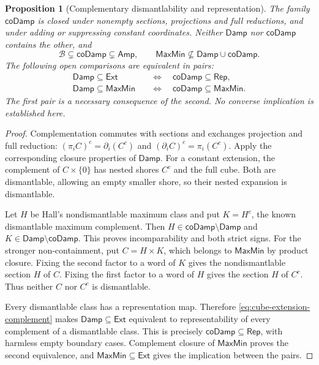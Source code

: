 \documentclass[11pt]{article}
\newtheorem{proposition}{Proposition}[section]
\theoremstyle{definition}
\newcommand{\Amp}{\mathsf{Amp}}
\newcommand{\MaxMin}{\mathsf{MaxMin}}
\newcommand{\Damp}{\mathsf{Damp}}
\newcommand{\Rep}{\mathsf{Rep}}
\begin{document}
\begin{proposition}[Complementary dismantlability and representation]
\label{prop:complement-dismantlable}
The family $\mathsf{coDamp}$ is closed under nonempty sections, projections
and full reductions, and under adding or suppressing constant coordinates.
Neither $\Damp$ nor $\mathsf{coDamp}$ contains the other, and
\[
 \mathcal B\subsetneq\mathsf{coDamp}\subsetneq\Amp,
 \qquad \MaxMin\not\subseteq\Damp\cup\mathsf{coDamp}.
\]
The following open comparisons are equivalent in pairs:
\begin{align*}
 \Damp\subseteq\mathsf{Ext}
 &\quad\Longleftrightarrow\quad\mathsf{coDamp}\subseteq\Rep,\\
 \Damp\subseteq\MaxMin
 &\quad\Longleftrightarrow\quad\mathsf{coDamp}\subseteq\MaxMin.
\end{align*}
The first pair is a necessary consequence of the second. No converse
implication is established here.
\end{proposition}
\begin{proof}
Complementation commutes with sections and exchanges projection and full
reduction: $(\pi_i C)^c=\partial_i(C^c)$ and
$(\partial_i C)^c=\pi_i(C^c)$. Apply the corresponding closure properties
of $\Damp$. For a constant extension, the complement of $C\times\{0\}$
has nested shores $C^c$ and the full cube. Both are dismantlable, allowing
an empty smaller shore, so their nested expansion is dismantlable.

Let $H$ be Hall's nondismantlable maximum class and put $K=H^c$, the
known dismantlable maximum complement. Then
$H\in\mathsf{coDamp}\setminus\Damp$ and
$K\in\Damp\setminus\mathsf{coDamp}$. This proves incomparability and
both strict signs. For the stronger non-containment, put $C=H\times K$,
which belongs to $\MaxMin$ by product closure. Fixing the second factor
to a word of $K$ gives the nondismantlable section $H$ of $C$.
Fixing the first factor to a word of $H$ gives the section $H$ of $C^c$.
Thus neither $C$ nor $C^c$ is dismantlable.

Every dismantlable class has a representation map. Therefore
\eqref{eq:cube-extension-complement} makes $\Damp\subseteq\mathsf{Ext}$
equivalent to representability of every complement of a dismantlable class.
This is precisely $\mathsf{coDamp}\subseteq\Rep$, with harmless empty
boundary cases. Complement closure of $\MaxMin$ proves the second
 equivalence, and $\MaxMin\subseteq\mathsf{Ext}$ gives the implication
between the pairs.
\end{proof}
\end{document}
